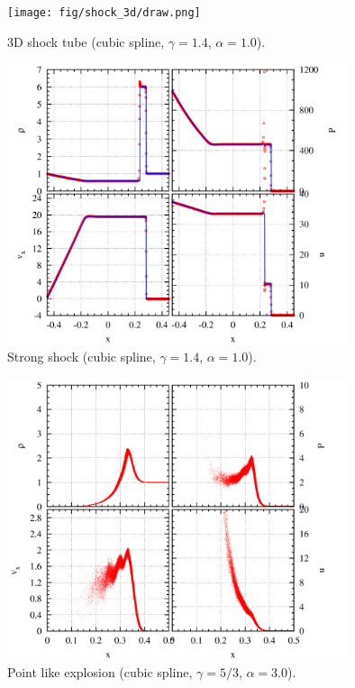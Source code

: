 \documentclass[fleqn,dvipdfmx]{article}
\begin{document}
\begin{figure}
  \begin{center}
    \texttt{[image: fig/shock\_3d/draw.png]}
  \end{center}
  \caption{3D shock tube (cubic spline, $\gamma=1.4$, $\alpha=1.0$).}
\end{figure}

\begin{figure}
  \begin{center}
    \includegraphics[width=10cm,bb=0 0 1020 840]{fig/strong/draw.png}
  \end{center}
  \caption{Strong shock (cubic spline, $\gamma=1.4$, $\alpha=1.0$).}
\end{figure}

\begin{figure}
  \begin{center}
    \includegraphics[width=10cm,bb=0 0 1020 840]{fig/pex/draw.png}
  \end{center}
  \caption{Point like explosion (cubic spline, $\gamma=5/3$,
    $\alpha=3.0$).}
\end{figure}
\end{document}
